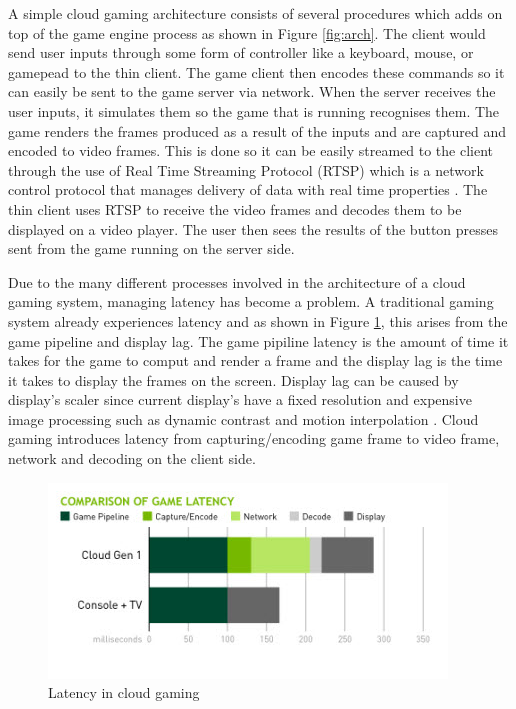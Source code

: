 A simple cloud gaming architecture consists of several procedures which adds on top of the game engine process as shown in Figure \ref{fig:arch}. The client would send user inputs through some form of controller like a keyboard, mouse, or gamepead to the thin client. The game client then encodes these commands so it can easily be sent to the game server via network. When the server receives the user inputs, it simulates them so the game that is running recognises them. The game renders the frames produced as a result of the inputs and are captured and encoded to video frames. This is done so it can be easily streamed to the client through the use of Real Time Streaming Protocol (RTSP) which is a network control protocol that manages delivery of data with real time properties \cite{rtsp}. The thin client uses RTSP to receive the video frames and decodes them to be displayed on a video player. The user then sees the results of the button presses sent from the game running on the server side.
\newline 
\par
Due to the many different processes involved in the architecture of a cloud gaming system, managing latency has become a problem. A traditional gaming system already experiences latency and as shown in Figure \ref{fig:latency}, this arises from the game pipeline and display lag. The game pipiline latency is the amount of time it takes for the game to comput and render a frame and the display lag is the time it takes to display the frames on the screen. Display lag can be caused by display's scaler since current display's have a fixed resolution and expensive image processing such as dynamic contrast and motion interpolation \cite{displaylag}. Cloud gaming introduces latency from capturing/encoding game frame to video frame, network and decoding on the client side.

\begin{figure}[h]
 \centering
 \includegraphics[width=0.8\linewidth]{images/latency.png}
 \caption{Latency in cloud gaming}
 \label{fig:latency}
\end{figure}

